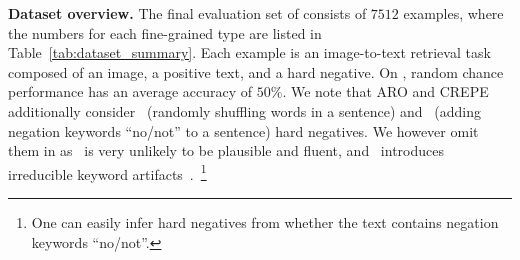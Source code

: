 \textbf{Dataset overview.} The final evaluation set of \method consists of $7512$ examples, where the numbers for each fine-grained type are listed in Table~\ref{tab:dataset_summary}.
Each example is an image-to-text retrieval task composed of an image, a positive text, and a hard negative. On \method, random chance performance has an average accuracy of $50\%$.
We note that ARO and CREPE additionally consider \shuffle\ (randomly shuffling words in a sentence) and \negate\ (adding negation keywords ``no/not'' to a sentence) hard negatives. We however omit them in \method as \shuffle\ is very unlikely to be plausible and fluent, and \negate\ introduces irreducible keyword artifacts~\cite{ma2022crepe}.~\footnote{One can easily infer hard negatives from whether the text contains negation keywords ``no/not''.}

